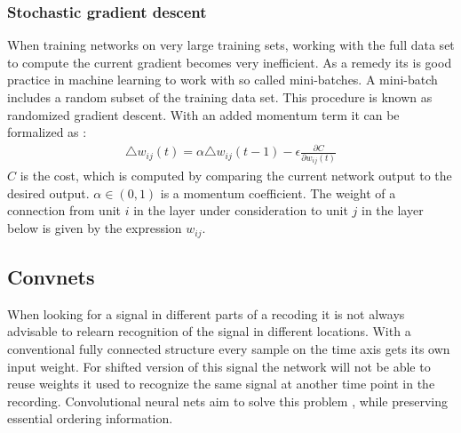 \subsubsection{Stochastic gradient descent}
When training networks on very large training sets, working with the full data set to compute the current gradient becomes very inefficient. As a remedy its is good practice in machine learning to work with so called mini-batches. A mini-batch includes a random subset of the training data set. This procedure is known as randomized gradient descent. With an added momentum term it can be formalized as \cite[page 4]{Hinton2012}:
\begin{align}
\triangle w_{ij}(t) = \alpha \triangle w_{ij}(t-1) - \epsilon \frac{\partial C}{\partial w_{ij}(t)}
\end{align}
$C$ is the cost, which is computed by comparing the current network output to the desired output. $\alpha \in (0,1)$ is a momentum coefficient. The weight of a connection from unit $i$ in the layer under consideration to unit $j$ in the layer below is given by the expression $w_{ij}$.

\subsection{Convnets}
When looking for a signal in different parts of a recoding it is not always advisable to relearn recognition
of the signal in different locations. With a conventional fully connected structure every sample on the time axis gets its own input weight. For shifted version of this signal the network will not be able to reuse weights it used
to recognize the same signal at another time point in the recording.
Convolutional neural nets aim to solve this problem \cite[page 6]{Dumoulin2016}, while preserving essential ordering information.

